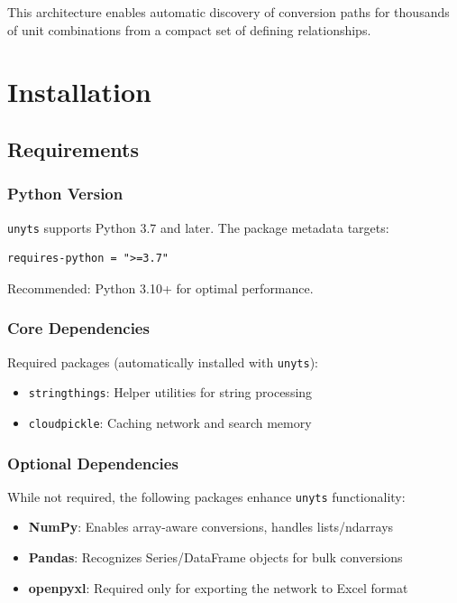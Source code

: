 \documentclass[11pt,a4paper]{report}
\begin{document}
This architecture enables automatic discovery of conversion paths for thousands of unit combinations from a compact set of defining relationships.


\chapter{Installation}

\section{Requirements}

\subsection{Python Version}
\texttt{unyts} supports Python 3.7 and later. The package metadata targets:
\begin{lstlisting}[style=bashstyle]
requires-python = ">=3.7"
\end{lstlisting}

Recommended: Python 3.10+ for optimal performance.

\subsection{Core Dependencies}

Required packages (automatically installed with \texttt{unyts}):
\begin{itemize}[leftmargin=*]
  \item \texttt{stringthings}: Helper utilities for string processing
  \item \texttt{cloudpickle}: Caching network and search memory
\end{itemize}

\subsection{Optional Dependencies}

While not required, the following packages enhance \texttt{unyts} functionality:
\begin{itemize}[leftmargin=*]
  \item \textbf{NumPy}: Enables array-aware conversions, handles lists/ndarrays
  \item \textbf{Pandas}: Recognizes Series/DataFrame objects for bulk conversions
  \item \textbf{openpyxl}: Required only for exporting the network to Excel format
\end{itemize}
\end{document}
